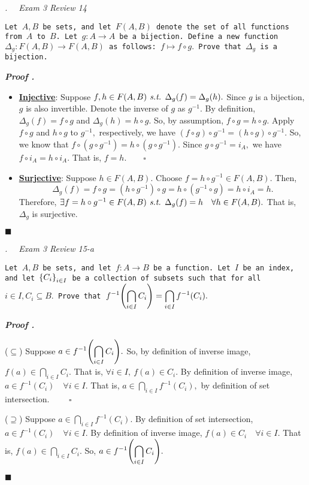 \documentclass[11pt,letter]{article}
\newcounter{nq}[section]
\newcounter{np}[section]
\newenvironment*{p}{\par\noindent\textbf{\textit{Proof \stepcounter{np}\thenp. }}\par}{\par\hfill $\blacksquare$\par}
\newenvironment*{q}[1]{\noindent\emph{\thesection.\stepcounter{nq}\thenq$\quad $ #1}\par\noindent\texttt}{}
\def\st{\emph{ s.t. }}
\def\dsst{\displaystyle}
\def\f{f^{-1}}
\def\of{\circ}
\def\g{g^{-1}}
\def\dg{\Delta_g}
\begin{document}
\begin{framed}\begin{q}
	{Exam 3 Review 14}
	{Let $A,B$ be sets, and let $F(A,B)$ denote the set of all functions from $A$ to $B$. Let $g:A\to A$ be a bijection. Define a new function $\Delta_g: F(A,B)\to F(A,B)$ as follows: $f\mapsto f\of g.$ Prove that $\Delta_g$ is a bijection.}
\end{q}\end{framed}
\begin{p}
	\begin{itemize}
		\item \underline{\textbf{Injective}}: Suppose $f,h\in F(A,B)\st \Delta_g(f)=\Delta_g(h).$ Since $g$ is a bijection, $g$ is also invertible. Denote the inverse of $g$ as $\g.$ By definition, $\dg(f)=f\of g$ and $\dg(h)=h\of g.$ So, by assumption, $f\of g=h\of g.$ Apply $f\of g$ and $h\of g$ to $\g,$ respectively, we have $(f\of g)\of\g=(h\of g)\of\g.$ So, we know that $f\of(g\of\g)=h\of(g\of\g).$ Since $g\of\g=i_A,$ we have $f\of i_A=h\of i_A.$ That is, $f=h.\qquad\square$
		\item \underline{\textbf{Surjective}}: Suppose $h\in F(A,B).$ Choose $f=h\of\g\in F(A,B).$ Then, \[\dg(f)=f\of g=(h\of\g)\of g=h\of(\g\of g)=h\of i_A=h.\] Therefore, $\exists f=h\of\g\in F(A,B)\st\dg(f)=h\quad\forall h\in F(A,B).$ That is, $\dg$ is surjective.
	\end{itemize}	
\end{p}

\begin{framed}\begin{q}
	{Exam 3 Review 15-a}
	{Let $A,B$ be sets, and let $f:A\to B$ be a function. Let $I$ be an index, and let $\qty{C_i}_{i\in I}$ be a collection of subsets such that for all $i\in I,C_i\subseteq B.$ Prove that $\dsst\f\qty(\bigcap_{i\in I}C_i)=\bigcap_{i\in I}\f(C_i).$}
\end{q}\end{framed}
\begin{p}
	($\subseteq$) Suppose $a\in\dsst\f\qty(\bigcap_{i\in I}C_i).$ So, by definition of inverse image, $f(a)\in \dsst\bigcap_{i\in I}C_i.$ That is, $\forall i\in I,\ f(a)\in C_i.$ By definition of inverse image, $a\in\f(C_i)\quad\forall i\in I.$ That is, $a\in\dsst\bigcap_{i\in I}\f(C_i),$ by definition of set intersection. $\qquad\square$\par 
	($\supseteq$)	Suppose $a\in\dsst\bigcap_{i\in I}\f(C_i).$ By definition of set intersection, $a\in\f(C_i)\quad\forall i\in I.$ By definition of inverse image, $f(a)\in C_i\quad\forall i\in I.$ That is, $f(a)\in\dsst\bigcap_{i\in I}C_i.$ So, $a\in\dsst\f\qty(\bigcap_{i\in I}C_i).$
\end{p}
\end{document}
